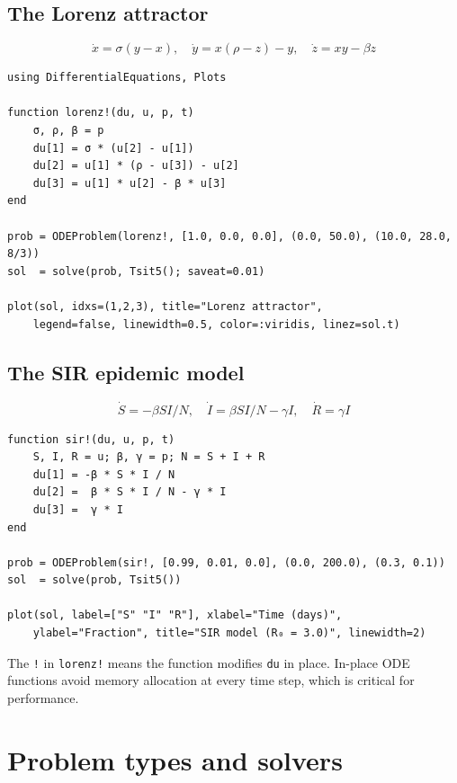 \subsection{The Lorenz attractor}

\[
\dot{x} = \sigma(y - x), \quad
\dot{y} = x(\rho - z) - y, \quad
\dot{z} = xy - \beta z
\]

\begin{verbatim}
using DifferentialEquations, Plots

function lorenz!(du, u, p, t)
    σ, ρ, β = p
    du[1] = σ * (u[2] - u[1])
    du[2] = u[1] * (ρ - u[3]) - u[2]
    du[3] = u[1] * u[2] - β * u[3]
end

prob = ODEProblem(lorenz!, [1.0, 0.0, 0.0], (0.0, 50.0), (10.0, 28.0, 8/3))
sol  = solve(prob, Tsit5(); saveat=0.01)

plot(sol, idxs=(1,2,3), title="Lorenz attractor",
    legend=false, linewidth=0.5, color=:viridis, linez=sol.t)
\end{verbatim}

\subsection{The SIR epidemic model}

\[
\dot{S} = -\beta S I / N, \quad
\dot{I} = \beta S I / N - \gamma I, \quad
\dot{R} = \gamma I
\]

\begin{verbatim}
function sir!(du, u, p, t)
    S, I, R = u; β, γ = p; N = S + I + R
    du[1] = -β * S * I / N
    du[2] =  β * S * I / N - γ * I
    du[3] =  γ * I
end

prob = ODEProblem(sir!, [0.99, 0.01, 0.0], (0.0, 200.0), (0.3, 0.1))
sol  = solve(prob, Tsit5())

plot(sol, label=["S" "I" "R"], xlabel="Time (days)",
    ylabel="Fraction", title="SIR model (R₀ = 3.0)", linewidth=2)
\end{verbatim}

\begin{juliatip}
The \texttt{!} in \texttt{lorenz!} means the function modifies \texttt{du} in place. In-place ODE functions avoid memory allocation at every time step, which is critical for performance.
\end{juliatip}

\section{Problem types and solvers}

